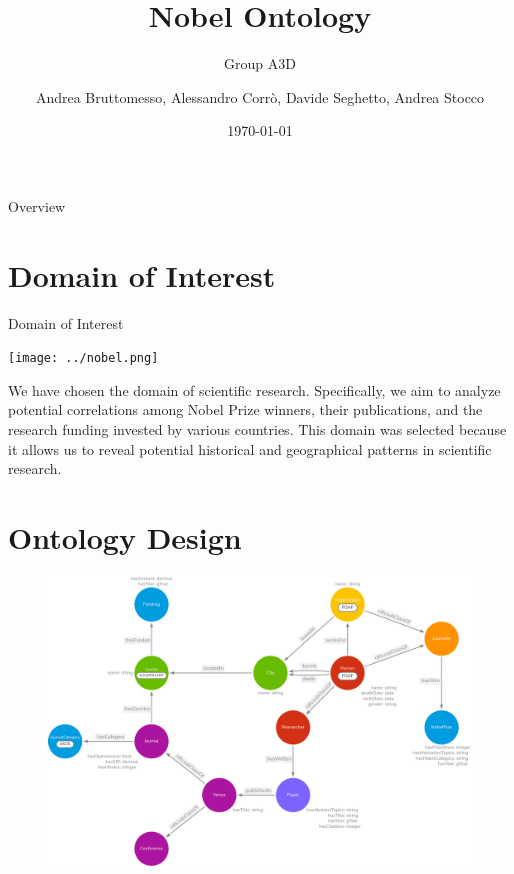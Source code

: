 \documentclass[aspectratio=169,xcolor=dvipsnames]{beamer}
\title{Nobel Ontology}
\subtitle{Group A3D}
\author{Andrea Bruttomesso, Alessandro Corr\`o, Davide Seghetto, Andrea Stocco}
\date{\today} %
\begin{document}
\begin{frame}
	\titlepage
\end{frame}

\begin{frame}{Overview}
	\tableofcontents
\end{frame}

\section{Domain of Interest}

\begin{frame}{Domain of Interest}
\centering
    \begin{minipage}{0.3\textwidth}
        \centering
        \texttt{[image: ../nobel.png]} %
    \end{minipage}%
    \hspace{3em}
    \begin{minipage}{0.4\textwidth}
        \centering
        We have chosen the domain of scientific research. Specifically, we aim to analyze potential correlations among Nobel Prize winners,
        their publications, and the research funding invested by various countries. This domain was selected because it allows us to reveal potential historical
        and geographical patterns in scientific research.
    \end{minipage}%
\end{frame}

\section{Ontology Design}

\begin{frame}[plain]
	\begin{figure}
		\includegraphics[width=0.75\linewidth]{../nobelOntologyTransparent.png}
	\end{figure}
\end{frame}
\end{document}
